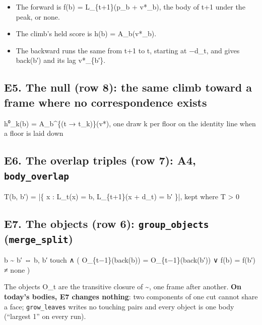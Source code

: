 \begin{itemize}
\item The forward is f(b) = L\_\allowbreak{}\{t+1\}(p\_\allowbreak{}b + v*\_\allowbreak{}b), the body of t+1 under the peak, or none.
\item The climb's held score is h(b) = A\_\allowbreak{}b(v*\_\allowbreak{}b).
\item The backward runs the same from t+1 to t, starting at −d\_\allowbreak{}t, and gives back(b′) and its lag v*\_\allowbreak{}\{b′\}.
\end{itemize}

\subsection{\texorpdfstring{E5. The null (row 8): the same climb toward a frame where no correspondence exists}{E5. The null (row 8): the same climb toward a frame where no correspondence exists}}

h⁰\_\allowbreak{}k(b) = A\_\allowbreak{}b\textasciicircum{}\{(t → t\_\allowbreak{}k)\}(v*),  one draw k per floor on the identity line when a floor is laid down

\subsection{\texorpdfstring{E6. The overlap triples (row 7): A4, \texttt{body\_\allowbreak{}overlap}}{E6. The overlap triples (row 7): A4, body\_overlap}}

T(b, b′) = |\{ x : L\_\allowbreak{}t(x) = b, L\_\allowbreak{}\{t+1\}(x + d\_\allowbreak{}t) = b′ \}|,  kept where T > 0

\subsection{\texorpdfstring{E7. The objects (row 6): \texttt{group\_\allowbreak{}objects} (\texttt{merge\_\allowbreak{}split})}{E7. The objects (row 6): group\_objects (merge\_split)}}

b \textasciitilde{} b′ ⇔ b, b′ touch ∧ ( O\_\allowbreak{}\{t−1\}(back(b)) = O\_\allowbreak{}\{t−1\}(back(b′)) ∨ f(b) = f(b′) ≠ none )

The objects O\_\allowbreak{}t are the transitive closure of \textasciitilde{}, one frame after another. \textbf{On today's bodies, E7 changes nothing}: two components of one cut cannot share a face; \texttt{grow\_\allowbreak{}leaves} writes no touching pairs and every object is one body (“largest 1” on every run).

